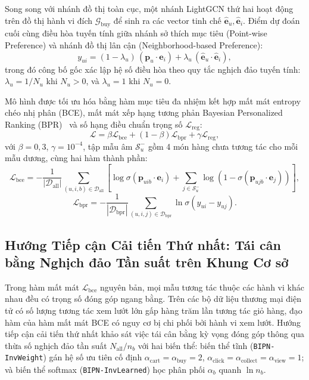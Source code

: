 \documentclass{llncs}
\begin{document}
Song song với nhánh đồ thị toàn cục, một nhánh LightGCN thứ hai hoạt động trên đồ thị hành vi đích $\mathcal{G}_{\mathrm{buy}}$ để sinh ra các vector tinh chế $\hat{\mathbf{e}}_u, \hat{\mathbf{e}}_i$. Điểm dự đoán cuối cùng điều hòa tuyến tính giữa nhánh sở thích mục tiêu (Point-wise Preference) và nhánh đồ thị lân cận (Neighborhood-based Preference):
\begin{equation}
y_{ui} = (1 - \lambda_u)\,(\mathbf{p}_u \cdot \mathbf{e}_i) + \lambda_u\,(\hat{\mathbf{e}}_u \cdot \hat{\mathbf{e}}_i),
\label{eq:prediction}
\end{equation}
trong đó công bố gốc xác lập hệ số điều hòa theo quy tắc nghịch đảo tuyến tính: $\lambda_u = 1 / N_u$ khi $N_u > 0$, và $\lambda_u = 1$ khi $N_u = 0$.

Mô hình được tối ưu hóa bằng hàm mục tiêu đa nhiệm kết hợp mất mát entropy chéo nhị phân (BCE), mất mát xếp hạng tương phản Bayesian Personalized Ranking (BPR)~\cite{rendle2009bpr} và số hạng điều chuẩn trọng số $\mathcal{L}_{\mathrm{reg}}$:
\begin{equation}
\mathcal{L} = \beta \mathcal{L}_{\mathrm{bce}} + (1 - \beta)\mathcal{L}_{\mathrm{bpr}} + \gamma \mathcal{L}_{\mathrm{reg}},
\label{eq:total_loss}
\end{equation}
với $\beta = 0{,}3$, $\gamma = 10^{-4}$, tập mẫu âm $\mathcal{S}_u^-$ gồm 4 món hàng chưa tương tác cho mỗi mẫu dương, cùng hai hàm thành phần:
\begin{equation}
\mathcal{L}_{\mathrm{bce}} = -\frac{1}{|\mathcal{D}_{\mathrm{all}}|} \sum_{(u, i, b) \in \mathcal{D}_{\mathrm{all}}} \left[\log \sigma(\mathbf{p}_{uib} \cdot \mathbf{e}_i) + \sum_{j \in \mathcal{S}_u^-} \log(1 - \sigma(\mathbf{p}_{ujb} \cdot \mathbf{e}_j))\right],
\end{equation}
\begin{equation}
\mathcal{L}_{\mathrm{bpr}} = -\frac{1}{|\mathcal{D}_{\mathrm{bpr}}|} \sum_{(u, i, j) \in \mathcal{D}_{\mathrm{bpr}}} \ln \sigma(y_{ui} - y_{uj}).
\end{equation}

\subsection{Hướng Tiếp cận Cải tiến Thứ nhất: Tái cân bằng Nghịch đảo Tần suất trên Khung Cơ sở}
\label{sec:weighted}

Trong hàm mất mát $\mathcal{L}_{\mathrm{bce}}$ nguyên bản, mọi mẫu tương tác thuộc các hành vi khác nhau đều có trọng số đóng góp ngang bằng. Trên các bộ dữ liệu thương mại điện tử có số lượng tương tác xem lướt lớn gấp hàng trăm lần tương tác giỏ hàng, đạo hàm của hàm mất mát BCE có nguy cơ bị chi phối bởi hành vi xem lướt. Hướng tiếp cận cải tiến thứ nhất khảo sát việc tái cân bằng kỳ vọng đóng góp thông qua thừa số nghịch đảo tần suất $N_{\mathrm{all}}/n_b$ với hai biến thể: biến thể tĩnh (\texttt{BIPN-InvWeight}) gán hệ số ưu tiên cố định $\alpha_{\mathrm{cart}} = \alpha_{\mathrm{buy}} = 2$, $\alpha_{\mathrm{click}} = \alpha_{\mathrm{collect}} = \alpha_{\mathrm{view}} = 1$; và biến thể softmax (\texttt{BIPN-InvLearned}) học phân phối $\alpha_b$ quanh $\ln n_b$.
\end{document}
